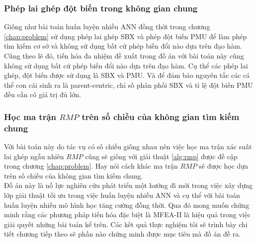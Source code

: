 \subsubsection{Phép lai ghép đột biến trong không gian chung}
Giống như bài toán huấn luyện nhiều ANN đồng thời trong chương \ref{chap:problem} sử dụng phép lai ghép SBX và phép đột biến PMU để làm phép tìm kiếm cơ sở và không sử dụng bất cứ phép biến đổi nào dựa trên đạo hàm. Cũng theo lẽ đó, tiến hóa đa nhiệm đề xuất trong đồ án với bài toán này cũng không sử dụng bất cứ phép biến đổi nào dựa trên đạo hàm. Cụ thể các phép lai ghép, đột biến được sử dụng là SBX và PMU. Và để đảm bảo nguyên tắc các cá thể con cái sinh ra là parent-centric, chỉ số phân phối SBX và tỉ lệ đột biến PMU đều cần có giá trị đủ lớn.

\subsubsection{Học ma trận $RMP$ trên số chiều của không gian tìm kiếm chung}
Với bài toán này do tác vụ có số chiều giống nhau nên việc học ma trận xác suất lai ghép ngẫu nhiên $RMP$ cũng sẽ giống với giải thuật \ref{alg:rmp} được đề cập trong chương \ref{chap:problem}. Hay nói cách khác ma trận $RMP$ sẽ được học dựa trên số chiều của không gian tìm kiếm chung.
\\[1cm]
Đồ án này là nỗ lực nghiên cứu phát triển một hướng đi mới trong việc xây dựng lớp giải thuật tối ưu trong việc huấn luyện nhiều ANN và cụ thể với bài toán huấn luyện nhiều mô hình học tăng cường đồng thời. Qua đó mong muốn chứng minh rằng các phương pháp tiến hóa đặc biệt là MFEA-II là hiệu quả trong việc giải quyết những bài toán kể trên. 
Các kết quả thực nghiệm tôi sẽ trình bày chi tiết chương tiếp theo sẽ phần nào chứng minh được mục tiêu mà đồ án đề ra.